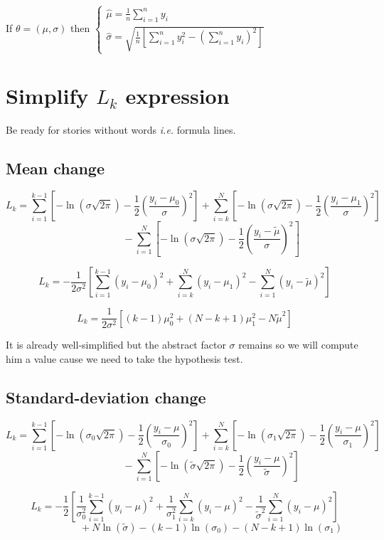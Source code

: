 \documentclass[11pt]{article}
\begin{document}
If $\theta=(\mu,\sigma)$ then $\begin{cases}\hat\mu=\frac 1n\sum_{i=1}^ny_i\\
\hat\sigma=\sqrt{\frac 1n\left[\sum_{i=1}^ny_i^2-(\sum_{i=1}^ny_i)^2\right]}\end{cases}$

\section{Simplify $L_k$ expression}

Be ready for stories without words \emph{i.e.} formula lines.

\subsection{Mean change}

\[L_k=
\sum_{i=1}^{k-1}\left[-\ln(\sigma\sqrt{2\pi})-\frac 12\left(\frac{y_i-\mu_0}{\sigma}\right)^2\right]
+\sum_{i=k}^N\left[-\ln(\sigma\sqrt{2\pi})-\frac 12\left(\frac{y_i-\mu_1}{\sigma}\right)^2\right]\]
\[~~~~~~~~~~~~~~~~~~~~~~~~-\sum_{i=1}^N\left[-\ln(\sigma\sqrt{2\pi})-\frac 12\left(\frac{y_i-\tilde\mu}{\sigma}\right)^2\right]\]

\[L_k=
-\frac 1{2\sigma^2}\left[\sum_{i=1}^{k-1}(y_i-\mu_0)^2
+\sum_{i=k}^N(y_i-\mu_1)^2
-\sum_{i=1}^N(y_i-\tilde\mu)^2\right]\]

\[L_k=\frac 1{2\sigma^2}\left[(k-1)\mu_0^2+(N-k+1)\mu_1^2-N\tilde\mu^2\right]\]

It is already well-simplified but the abstract factor $\sigma$ remains so we will compute him a value cause we need to take the hypothesis test.

\subsection{Standard-deviation change}

\[L_k=
\sum_{i=1}^{k-1}\left[-\ln(\sigma_0\sqrt{2\pi})-\frac 12\left(\frac{y_i-\mu}{\sigma_0}\right)^2\right]
+\sum_{i=k}^N\left[-\ln(\sigma_1\sqrt{2\pi})-\frac 12\left(\frac{y_i-\mu}{\sigma_1}\right)^2\right]\]
\[~~~~~~~~~~~~~~~~~~~~~~~~-\sum_{i=1}^N\left[-\ln(\tilde\sigma\sqrt{2\pi})-\frac 12\left(\frac{y_i-\mu}{\tilde\sigma}\right)^2\right]\]

\[L_k=
-\frac 12\left[\frac 1{\sigma_0^2}\sum_{i=1}^{k-1}(y_i-\mu)^2
+\frac 1{\sigma_1^2}\sum_{i=k}^N(y_i-\mu)^2
-\frac 1{\tilde\sigma^2}\sum_{i=1}^N(y_i-\mu)^2\right]\]
\[~~~~~~~~~~~~~~~~~~~~~~~~+N\ln(\tilde\sigma)-(k-1)\ln(\sigma_0)-(N-k+1)\ln(\sigma_1)\]
\end{document}
